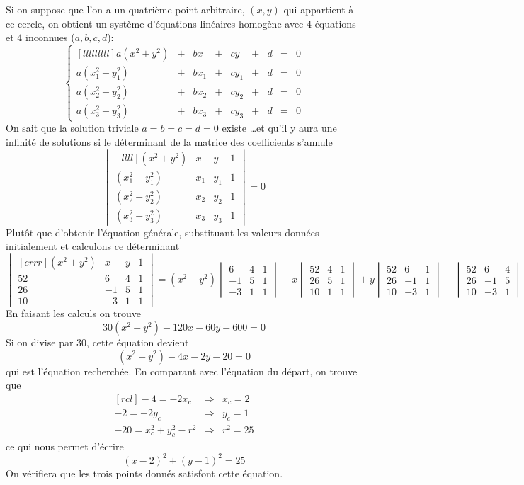 Si on suppose que l'on a un quatrième point arbitraire, $(x,y)$ qui appartient à
ce cercle, on obtient un système d'équations linéaires homogène avec 4 équations
et 4 inconnues ($a,b,c,d$):
\[
\left\{
\begin{matrix}[lllllllll]
a(x^2+y^2) &+& bx &+& cy &+& d &=& 0 \\
a(x^2_1+y^2_1) &+& bx_1 &+& cy_1 &+& d &=& 0 \\
a(x^2_2+y^2_2) &+& bx_2 &+& cy_2 &+& d &=& 0 \\
a(x^2_3+y^2_3) &+& bx_3 &+& cy_3 &+& d &=& 0
\end{matrix}
\right.
\]
On sait que la solution triviale $a=b=c=d=0$ existe \ldots et qu'il y aura une
infinité de solutions si le déterminant de la matrice des coefficients
s'annule
\[
\begin{vmatrix}[llll]
(x^2+y^2) & x & y & 1\\
(x^2_1+y^2_1) & x_1 & y_1 & 1\\
(x^2_2+y^2_2) & x_2 & y_2 & 1\\
(x^2_3+y^2_3) & x_3 & y_3 & 1
\end{vmatrix}
=0
\]
Plutôt que d'obtenir l'équation générale, substituant les valeurs données initialement
et calculons ce déterminant
\[
\begin{vmatrix}[crrr]
(x^2+y^2) & x & y & 1\\
52 & 6 & 4 & 1\\
26 & -1 & 5 & 1\\
10 & -3 & 1 & 1
\end{vmatrix}
= (x^2+y^2) \begin{vmatrix}
 6 & 4 & 1\\
 -1 & 5 & 1\\
-3 & 1 & 1
\end{vmatrix} - x \begin{vmatrix}
52  & 4 & 1\\
26  & 5 & 1\\
10  & 1 & 1
\end{vmatrix} + y \begin{vmatrix}
52 & 6 & 1\\
26 & -1 & 1\\
10 & -3 &  1
\end{vmatrix} - \begin{vmatrix}
52 & 6 & 4 \\
26 & -1 & 5 \\
10 & -3 & 1 
\end{vmatrix} = 0
\]
En faisant les calculs on trouve
\[
30(x^2 + y^2) -120 x -60y -600 = 0
\]
Si on divise par 30, cette équation devient
\[
(x^2 + y^2) -4 x -2y -20 = 0
\]
qui est l'équation recherchée.  
En comparant avec l'équation du départ, on trouve que
\[
\begin{matrix}[rcl]
-4 = -2x_c &\Rightarrow& x_c = 2 \\
-2 = -2y_c &\Rightarrow& y_c = 1 \\
-20 = x_c^2 + y_c^2 - r^2 &\Rightarrow& r^2=25
\end{matrix}
\]
ce qui nous permet d'écrire
\[
(x-2)^2 + (y-1)^2 = 25
\]
On vérifiera que les trois points donnés satisfont cette équation.

